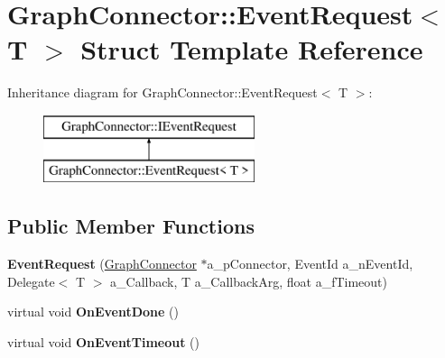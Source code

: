 \hypertarget{struct_graph_connector_1_1_event_request}{}\section{Graph\+Connector\+:\+:Event\+Request$<$ T $>$ Struct Template Reference}
\label{struct_graph_connector_1_1_event_request}
Inheritance diagram for Graph\+Connector\+:\+:Event\+Request$<$ T $>$\+:\begin{figure}[H]
\begin{center}
\leavevmode
\includegraphics[height=2.000000cm]{struct_graph_connector_1_1_event_request}
\end{center}
\end{figure}
\subsection*{Public Member Functions}
\begin{DoxyCompactItemize}
\item 
\mbox{\label{struct_graph_connector_1_1_event_request_a5a97eecb5aa1ed4b230888ca377516bf}} 
{\bfseries Event\+Request} (\hyperlink{class_graph_connector}{Graph\+Connector} $\ast$a\+\_\+p\+Connector, Event\+Id a\+\_\+n\+Event\+Id, Delegate$<$ T $>$ a\+\_\+\+Callback, T a\+\_\+\+Callback\+Arg, float a\+\_\+f\+Timeout)
\item 
\mbox{\label{struct_graph_connector_1_1_event_request_ad1769de9927b0e896ced493d91aaaffe}} 
virtual void {\bfseries On\+Event\+Done} ()
\item 
\mbox{\label{struct_graph_connector_1_1_event_request_a60e77ff91a97ad27ad674605d57a9167}} 
virtual void {\bfseries On\+Event\+Timeout} ()
\end{DoxyCompactItemize}
